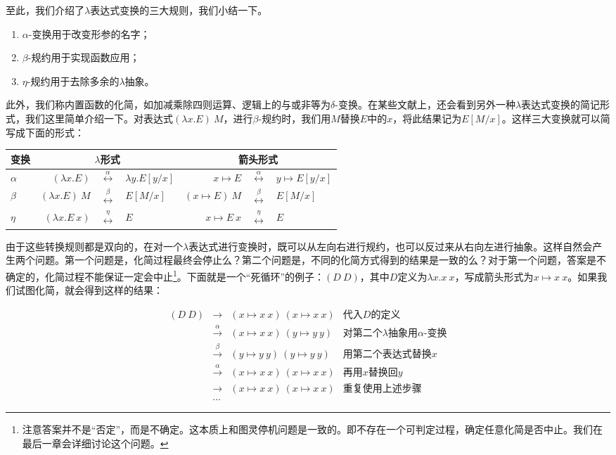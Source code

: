 \documentclass[b5paper]{ctexart}
\begin{document}
至此，我们介绍了$\lambda$表达式变换的三大规则，我们小结一下。

\begin{enumerate}
\item $\alpha$-变换用于改变形参的名字；
\item $\beta$-规约用于实现函数应用；
\item $\eta$-规约用于去除多余的$\lambda$抽象。
\end{enumerate}

此外，我们称内置函数的化简，如加减乘除四则运算、逻辑上的与或非等为$\delta$-变换。在某些文献上，还会看到另外一种$\lambda$表达式变换的简记形式，我们这里简单介绍一下。对表达式$(\lambda x. E)\ M$，进行$\beta$-规约时，我们用$M$替换$E$中的$x$，将此结果记为$E[M/x]$。这样三大变换就可以简写成下面的形式：

\vspace{5mm}
\begin{tabular}{|l|rcl|rcl|}
\hline
变换 & \multicolumn{3}{|c|}{$\lambda$形式} & \multicolumn{3}{|c|}{箭头形式} \\
\hline
$\alpha$ & $(\lambda x . E)$ & $\overset{\alpha}{\longleftrightarrow}$ & $\lambda y . E[y/x]$
         & $x \mapsto E$ & $\overset{\alpha}{\longleftrightarrow}$ & $y \mapsto E[y/x]$ \\
\hline
$\beta$  & $(\lambda x . E)\ M$ & $\overset{\beta}{\longleftrightarrow}$ & $E[M/x]$
         & $(x \mapsto E)\ M$ & $\overset{\beta}{\longleftrightarrow}$ & $E[M/x]$ \\
\hline
$\eta$   & $(\lambda x . E\ x)$ & $\overset{\eta}{\longleftrightarrow}$ & $E$
         & $x \mapsto E\ x$ & $\overset{\eta}{\longleftrightarrow}$ & $E$ \\
\hline
\end{tabular}
\vspace{5mm}

由于这些转换规则都是双向的，在对一个$\lambda$表达式进行变换时，既可以从左向右进行规约，也可以反过来从右向左进行抽象。这样自然会产生两个问题。第一个问题是，化简过程最终会停止么？第二个问题是，不同的化简方式得到的结果是一致的么？对于第一个问题，答案是不确定的，化简过程不能保证一定会中止\footnote{注意答案并不是“否定”，而是不确定。这本质上和图灵停机问题是一致的。即不存在一个可判定过程，确定任意化简是否中止。我们在最后一章会详细讨论这个问题。}。下面就是一个“死循环”的例子：$(D\ D)$，其中$D$定义为$\lambda x. x\ x$，写成箭头形式为$x \mapsto x\ x$。如果我们试图化简，就会得到这样的结果：

\[
\begin{array}{rcll}
(D\ D) & \to & (x \mapsto x\ x)\ (x \mapsto x\ x) & \text{代入$D$的定义} \\
       & \xrightarrow{\alpha} & (x \mapsto x\ x)\ (y \mapsto y\ y) & \text{对第二个$\lambda$抽象用$\alpha$-变换} \\
       & \xrightarrow{\beta} & (y \mapsto y\ y)\ (y \mapsto y\ y) & \text{用第二个表达式替换$x$} \\
       & \xrightarrow{\alpha} & (x \mapsto x\ x)\ (x \mapsto x\ x) & \text{再用$x$替换回$y$} \\
       & \to & (x \mapsto x\ x)\ (x \mapsto x\ x) & \text{重复使用上述步骤} \\
       & ... &
\end{array}
\]
\end{document}
